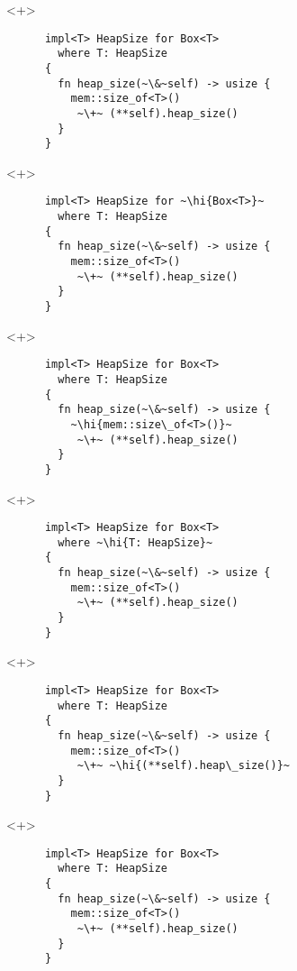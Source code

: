 \documentclass[usepdftitle=false]{beamer}
\renewcommand{\&}{\makebox[\widthof{\ampersand}][c]{\scalebox{0.9}[1.0]{\Book\ampersand}}}
\newcommand{\+}{\makebox[\widthof{+}][c]{\raisebox{-.2\height}{\scalefont{1.5}\Light+}}}
\newcommand{\hi}[1]{%
\tikz[baseline=(A.base)]
 \node[highlighting=0,inner sep=0pt,text depth=0pt] (A) {#1};%
}
\begin{document}
\begin{frame}[fragile]
  \begin{onlyenv}<+>
    \begin{verbatim}
      impl<T> HeapSize for Box<T>
        where T: HeapSize
      {
        fn heap_size(~\&~self) -> usize {
          mem::size_of<T>()
           ~\+~ (**self).heap_size()
        }
      }
    \end{verbatim}
  \end{onlyenv}
  \begin{onlyenv}<+>
    \begin{verbatim}
      impl<T> HeapSize for ~\hi{Box<T>}~
        where T: HeapSize
      {
        fn heap_size(~\&~self) -> usize {
          mem::size_of<T>()
           ~\+~ (**self).heap_size()
        }
      }
    \end{verbatim}
  \end{onlyenv}
  \begin{onlyenv}<+>
    \begin{verbatim}
      impl<T> HeapSize for Box<T>
        where T: HeapSize
      {
        fn heap_size(~\&~self) -> usize {
          ~\hi{mem::size\_of<T>()}~
           ~\+~ (**self).heap_size()
        }
      }
    \end{verbatim}
  \end{onlyenv}
  \begin{onlyenv}<+>
    \begin{verbatim}
      impl<T> HeapSize for Box<T>
        where ~\hi{T: HeapSize}~
      {
        fn heap_size(~\&~self) -> usize {
          mem::size_of<T>()
           ~\+~ (**self).heap_size()
        }
      }
    \end{verbatim}
  \end{onlyenv}
  \begin{onlyenv}<+>
    \begin{verbatim}
      impl<T> HeapSize for Box<T>
        where T: HeapSize
      {
        fn heap_size(~\&~self) -> usize {
          mem::size_of<T>()
           ~\+~ ~\hi{(**self).heap\_size()}~
        }
      }
    \end{verbatim}
  \end{onlyenv}
  \begin{onlyenv}<+>
    \begin{verbatim}
      impl<T> HeapSize for Box<T>
        where T: HeapSize
      {
        fn heap_size(~\&~self) -> usize {
          mem::size_of<T>()
           ~\+~ (**self).heap_size()
        }
      }
    \end{verbatim}

\end{onlyenv}
\end{frame}
\end{document}
